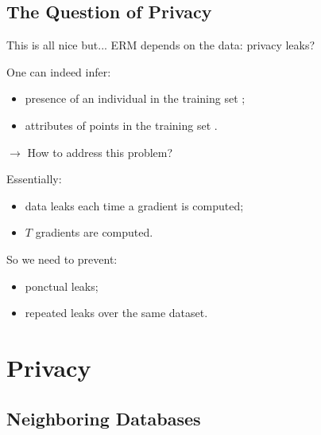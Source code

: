\documentclass[notheorems]{beamer}
\begin{document}
\subsection{The Question of Privacy}
\label{sub:the_question_of_privacy}


\begin{frame}
  This is all nice but... ERM depends on the data: privacy leaks?

  \vspace{1em}

  One can indeed infer:
  \begin{itemize}
  \item presence of an individual in the training set ;
  \item attributes of points in the training set .
  \end{itemize}

  \vspace{2em}

  $\rightarrow$ How to address this problem?
\end{frame}


\begin{frame}
  Essentially:
  \begin{itemize}
  \item data leaks each time a gradient is computed;
  \item $T$ gradients are computed.
  \end{itemize}

  \vspace{1em}

  So we need to prevent:
  \begin{itemize}
  \item ponctual leaks;
  \item repeated leaks over the same dataset.
  \end{itemize}
\end{frame}

\section{Privacy}
\label{sec:privacy}


\subsection{Neighboring Databases}
\label{sub:neighboring_databases}
\end{document}
